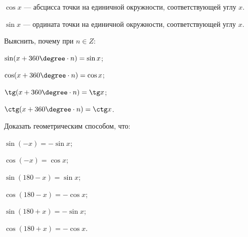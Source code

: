 \begin{class}[number=1]
\begin{listofex}
{\begin{minipage}[t]{0,92\textwidth}
				\textbf{\boldmath\( {\cos x} \)} --- абсцисса точки на единичной окружности, соответствующей углу \( x \).
				
				\textbf{\boldmath\( \sin x \)} --- ордината точки на единичной окружности, соответствующей углу \( x \).
			\end{minipage}
		}
		\item {}
		\item Выяснить, почему при \( n\in Z \):
		\begin{enumcols}[itemcolumns=2]
			\item \( \sin(x+360\degree\cdot n) = \sin x \);
			\item \( \cos(x+360\degree\cdot n) = \cos x \);
			\item \( \tg(x+360\degree\cdot n) = \tg x \);
			\item \( \ctg(x+360\degree\cdot n) = \ctg x \).
		\end{enumcols}
		\item Доказать геометрическим способом, что:
		\begin{enumcols}[itemcolumns=3]
			\item \( \sin(-x) = -\sin x \);
			\item \( \cos(-x) = \cos x \);
			\item \( \sin(180 - x) = \sin x \);
			\item \( \cos(180 - x) = -\cos x \);
			\item \( \sin(180+x) = -\sin x \);
			\item \( \cos(180+x) = -\cos x \).
		\end{enumcols}
	\end{listofex}
\end{class}
